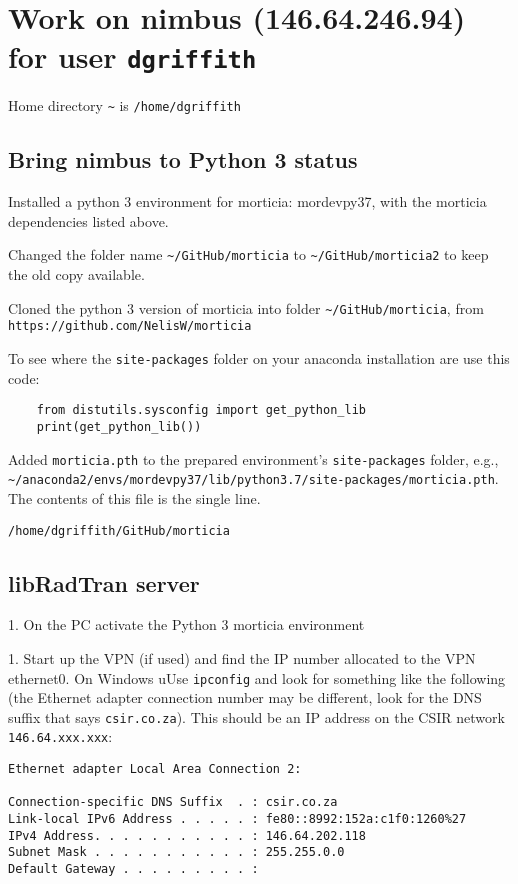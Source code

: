 \section{Work on nimbus (146.64.246.94) for user \lstinline{dgriffith}}

Home directory \lstinline{~} is \lstinline{/home/dgriffith}

\subsection{Bring nimbus to Python 3 status}

Installed a python 3 environment for morticia: mordevpy37, with the morticia dependencies listed above.

Changed the folder name  \lstinline{~/GitHub/morticia} to \lstinline{~/GitHub/morticia2} to keep the old copy available.

Cloned the python 3 version of morticia into folder \lstinline{~/GitHub/morticia}, from \lstinline{https://github.com/NelisW/morticia}

To see where the \lstinline{site-packages} folder on your anaconda installation are use this code:

\begin{lstlisting}
    from distutils.sysconfig import get_python_lib
    print(get_python_lib())

\end{lstlisting}
Added \lstinline{morticia.pth} to the prepared environment's \lstinline{site-packages} folder, e.g.,  \lstinline{~/anaconda2/envs/mordevpy37/lib/python3.7/site-packages/morticia.pth}. The contents of this file is the single line. 

    \lstinline{/home/dgriffith/GitHub/morticia}


\subsection{libRadTran server}

1. On the PC activate the Python 3 morticia environment 

1. Start up the VPN (if used) and find the IP number allocated to the VPN ethernet0. On Windows uUse \lstinline{ipconfig} and look for something like the following (the Ethernet adapter connection number may be different, look for the DNS suffix that says \lstinline{csir.co.za}). This should be an IP address on the CSIR network \lstinline{146.64.xxx.xxx}:

\begin{lstlisting}
Ethernet adapter Local Area Connection 2:

Connection-specific DNS Suffix  . : csir.co.za
Link-local IPv6 Address . . . . . : fe80::8992:152a:c1f0:1260%27
IPv4 Address. . . . . . . . . . . : 146.64.202.118
Subnet Mask . . . . . . . . . . . : 255.255.0.0
Default Gateway . . . . . . . . . :
\end{lstlisting}

